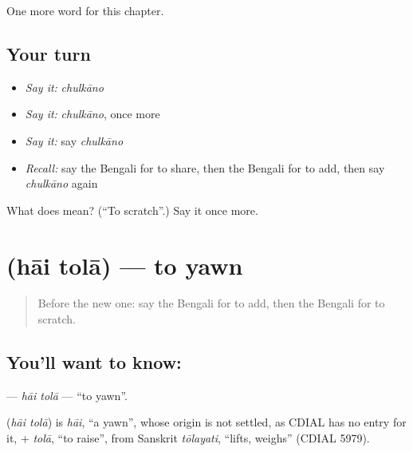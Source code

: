 \begin{grammarlens}[title={What you've built}]
One more word for this chapter.
\end{grammarlens}

\subsection*{Your turn}
\begin{itemize}
\raggedright
  \item \emph{Say it:} \emph{chulkāno}
  \item \emph{Say it:} \emph{chulkāno}, once more
  \item \emph{Say it:} say \emph{chulkāno}
  \item \emph{Recall:} say the Bengali for to share, then the Bengali for to add, then say \emph{chulkāno} again
\end{itemize}

\begin{tcolorbox}[breakable,colback=teal!4,colframe=teal!35!black,title={Before you move on}]
What does  mean? (\textquotedblleft{}To scratch\textquotedblright{}.) Say it once more.
\end{tcolorbox}
\section[\texorpdfstring{\bn{হাই} \bn{তোলা} (hāi tolā)}{হাই তোলা (hāi tolā)}]{  (hāi tolā) — to yawn}

\label{lesson:BN-C183-hai-tola}



\begin{quote}
Before the new one: say the Bengali for to add, then the Bengali for to scratch.
\end{quote}

\subsection*{You'll want to know:  }
\textbf{ } — \emph{hāi tolā} — \textquotedblleft{}to yawn\textquotedblright{}.

\begin{cousinweb}
\textbf{ } (\emph{hāi tolā}) is \emph{hāi}, \textquotedblleft{}a yawn\textquotedblright{}, whose origin is not settled, as CDIAL has no entry for it, + \emph{tolā}, \textquotedblleft{}to raise\textquotedblright{}, from Sanskrit \emph{tōlayati}, \textquotedblleft{}lifts, weighs\textquotedblright{} (CDIAL 5979).
\end{cousinweb}


